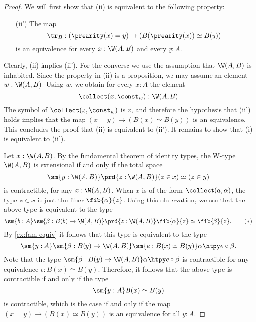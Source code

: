 \begin{proof}
  We will first show that (ii) is equivalent to the following property:
  \begin{enumerate}
  \item[(ii')] The map
    \begin{equation*}
      \tr_B : (\prearity(x)=y)\to (B(\prearity(x))\simeq B(y))
    \end{equation*}
    is an equivalence for every $x:\W(A,B)$ and every $y:A$.
  \end{enumerate}
  Clearly, (ii) implies (ii'). For the converse we use the assumption that $\W(A,B)$ is inhabited. Since the property in (ii) is a proposition, we may assume an element $w:\W(A,B)$. Using $w$, we obtain for every $x:A$ the element
  \begin{equation*}
    \collect(x,\const_w):\W(A,B)
  \end{equation*}
  The symbol of $\collect(x,\const_w)$ is $x$, and therefore the hypothesis that (ii') holds implies that the map $(x=y)\to (B(x)\simeq B(y))$ is an equivalence. This concludes the proof that (ii) is equivalent to (ii'). It remains to show that (i) is equivalent to (ii').

  Let $x:\W(A,B)$. By the fundamental theorem of identity types, the W-type $\W(A,B)$ is extensional if and only if the total space
  \begin{equation*}
    \sm{y:\W(A,B)}\prd{z:\W(A,B)}(z\in x)\simeq (z\in y)
  \end{equation*}
  is contractible, for any $x:\W(A,B)$. When $x$ is of the form $\collect(a,\alpha)$, the type $z\in x$ is just the fiber $\fib{\alpha}{z}$. Using this observation, we see that the above type is equivalent to the type
  \begin{equation*}
    \sm{b:A}\sm{\beta:B(b)\to\W(A,B)}\prd{z:\W(A,B)}\fib{\alpha}{z}\simeq\fib{\beta}{z}.\tag{\textasteriskcentered}
  \end{equation*}
  By \cref{ex:fam-equiv} it follows that this type is equivalent to the type
  \begin{equation*}
    \sm{y:A}\sm{\beta:B(y)\to\W(A,B)}\sm{e:B(x)\simeq B(y)}\alpha\htpy e\circ \beta.
  \end{equation*}
  Note that the type $\sm{\beta:B(y)\to\W(A,B)}\alpha\htpy e\circ\beta$ is contractible for any equivalence $e:B(x)\simeq B(y)$. Therefore, it follows that the above type is contractible if and  only if the type
  \begin{equation*}
    \sm{y:A}B(x)\simeq B(y)
  \end{equation*}
  is contractible, which is the case if and only if the map $(x=y)\to(B(x)\simeq B(y))$ is an equivalence for all $y:A$.
\end{proof}

